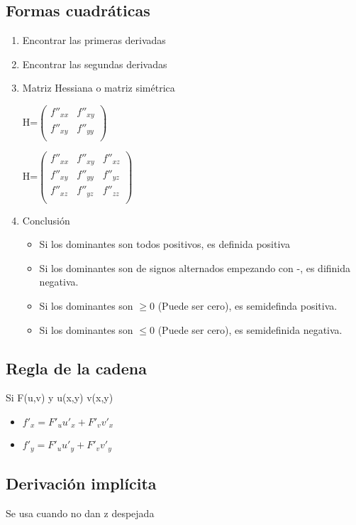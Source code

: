 \subsection{Formas cuadráticas}
\begin{enumerate}
	\item Encontrar las primeras derivadas
	\item Encontrar las segundas derivadas
	\item Matriz Hessiana o matriz simétrica
	
	H=$\begin{pmatrix}
	f''_{xx} & f''_{xy} \\
	f''_{xy} & f''_{yy} \\
	\end{pmatrix}$
	
	H=$\begin{pmatrix}
	f''_{xx} & f''_{xy} & f''_{xz} \\
	f''_{xy} & f''_{yy} & f''_{yz}\\
	f''_{xz} & f''_{yz} & f''_{zz}\\
	\end{pmatrix}$
	\item Conclusión
	\begin{itemize}
		\item Si los dominantes son todos positivos, es definida positiva
		\item Si los dominantes son de signos alternados empezando con -, es difinida negativa.
		\item Si los dominantes son $\geq 0$ (Puede ser cero), es semidefinda positiva.
		\item Si los dominantes son $\leq 0$ (Puede ser cero), es semidefinida negativa.
	\end{itemize}
\end{enumerate}

\subsection{Regla de la cadena}
Si F(u,v) y u(x,y) v(x,y)
\begin{itemize}
	\item $f'_x=F'_uu'_x+F'_vv'_x$
	\item $f'_y=F'_uu'_y+F'_vv'_y$
\end{itemize}

\subsection{Derivación implícita}
Se usa cuando no dan z despejada

